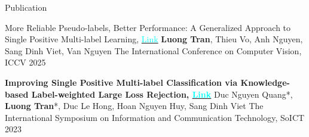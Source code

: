 \documentclass{resume} %
\begin{document}
\begin{rSection}{Publication}
\begin{rSubsectionPaper}
\end{rSubsectionPaper}

\vspace{-0.4cm}

\begin{rSubsectionPaper}
    {More Reliable Pseudo-labels, Better Performance: A Generalized Approach to Single Positive Multi-label Learning, \href{https://openaccess.thecvf.com/content/ICCV2025/papers/Tran_More_Reliable_Pseudo-labels_Better_Performance_A_Generalized_Approach_to_Single_ICCV_2025_paper.pdf}{\textcolor{cyan}{Link}}}
    {\textbf{Luong Tran}, Thieu Vo, Anh Nguyen, Sang Dinh Viet, Van Nguyen}
    {The International Conference on Computer Vision, ICCV 2025}
    {}
    
  \end{rSubsectionPaper}

\vspace{-0.4cm}


\begin{rSubsectionPaper}
    {\bf{Improving Single Positive Multi-label Classification via Knowledge-based Label-weighted Large Loss Rejection}, \href{https://dl.acm.org/doi/abs/10.1145/3628797.3629002}{\textcolor{cyan}{Link}}}
    {Duc Nguyen Quang*, \textbf{Luong Tran}*, Duc Le Hong, Hoan Nguyen Huy, Sang Dinh Viet}
    {The International Symposium on Information and Communication Technology, SoICT 2023}
    {}
    
  \end{rSubsectionPaper}

\vspace{-0.4cm}






\end{rSection}
\end{document}
